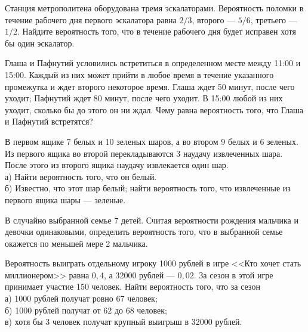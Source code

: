 \newpage\setcounter{zad}{0}



\begin{zkrW}{20}\noindent 
	Станция метрополитена оборудована тремя эскалаторами. Вероятность поломки в течение рабочего дня первого эскалатора равна $2/3$, второго --- $5/6$, третьего ---  $1/2$. Найдите вероятность того, что в течение рабочего дня будет исправен хотя бы один эскалатор.
 
\end{zkrW}

\begin{zkrW}{20}\noindent 
	Глаша и Пафнутий условились встретиться в определенном месте между 11:00 и 15:00. Каждый из них может прийти в любое время в течение указанного промежутка и ждет второго некоторое время. Глаша ждет 50 минут, после чего уходит; Пафнутий ждет 80 минут, после чего уходит. В 15:00 любой из них уходит, сколько бы до этого он ни ждал. Чему равна вероятность того, что Глаша и Пафнутий встретятся?
 
\end{zkrW}

\begin{zkrW}{20}\noindent 
	В первом ящике 7 белых и 10 зеленых шаров, а во втором 9 белых и 6 зеленых. Из первого ящика во второй перекладываются 3 наудачу извлеченных шара. После этого из второго ящика наудачу извлекается один шар. \\ \indent а) Найти вероятность того, что он белый. \\ \indent б) Известно, что этот шар белый; найти вероятность того, что извлеченные из первого ящика шары --- зеленые.
 
\end{zkrW}

\begin{zkrW}{20}\noindent 
	В случайно выбранной семье 7 детей. Считая вероятности рождения мальчика и девочки одинаковыми, определить вероятность того, что в выбранной семье окажется по меньшей мере 2 мальчика.
 
\end{zkrW}

\begin{zkrW}{20}\noindent 
	Вероятность выиграть отдельному игроку 1000 рублей в игре <<Кто хочет стать миллионером>> равна $0{,}4$, а 32000 рублей --- $0{,}02$. За сезон в этой игре принимает участие 150 человек. Найти вероятность того, что за сезон \\ \indent а) 1000 рублей получат ровно 67 человек; \\ \indent б) 1000 рублей получат от 62 до 68 человек; \\ \indent в) хотя бы 3 человек получат крупный выигрыш в 32000 рублей.
 
\end{zkrW}

